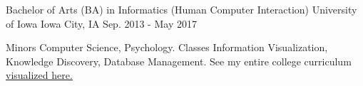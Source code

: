 \begin{cventries}
  \cventry
    {Bachelor of Arts (BA) in Informatics (Human Computer Interaction)}
    {University of Iowa}
    {Iowa City, IA}
    {Sep. 2013 - May 2017}
    {
      \begin{cvitemED}
          \cvskillED
            {Minors}
            {Computer Science, Psychology.}
          \cvskillED
            {Classes}
            {Information Visualization, Knowledge Discovery, Database Management. See my entire college curriculum \href{https://www.github.com/ryan-p-larson/college-sankey/}{visualized here.}}
      \end{cvitemED}
    }
\end{cventries}
